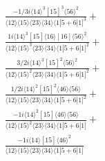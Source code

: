 \documentclass[varwidth, border=5pt]{standalone}
\begin{document}
\begin{my}
$\begin{gathered}
\scriptscriptstyle\frac{-1/3i\langle14\rangle^3[15]^3\langle56\rangle^2}{\langle12\rangle\langle15\rangle\langle23\rangle\langle34\rangle\langle1|5+6|1]^3}+\\
\scriptscriptstyle\frac{1i\langle14\rangle^3[15]\langle16\rangle[16]\langle56\rangle^2}{\langle12\rangle\langle15\rangle^3\langle23\rangle\langle34\rangle\langle1|5+6|1]^2}+\\
\scriptscriptstyle\frac{3/2i\langle14\rangle^3[15]^2\langle56\rangle^2}{\langle12\rangle\langle15\rangle^2\langle23\rangle\langle34\rangle\langle1|5+6|1]^2}+\\
\scriptscriptstyle\frac{1/2i\langle14\rangle^2[15]^2\langle46\rangle\langle56\rangle}{\langle12\rangle\langle15\rangle\langle23\rangle\langle34\rangle\langle1|5+6|1]^2}+\\
\scriptscriptstyle\frac{-1i\langle14\rangle^2[15]\langle46\rangle\langle56\rangle}{\langle12\rangle\langle15\rangle^2\langle23\rangle\langle34\rangle\langle1|5+6|1]}+\\
\scriptscriptstyle\frac{-1i\langle14\rangle[15]\langle46\rangle^2}{\langle12\rangle\langle15\rangle\langle23\rangle\langle34\rangle\langle1|5+6|1]}\phantom{+}
\end{gathered}$
\end{my}
\end{document}
